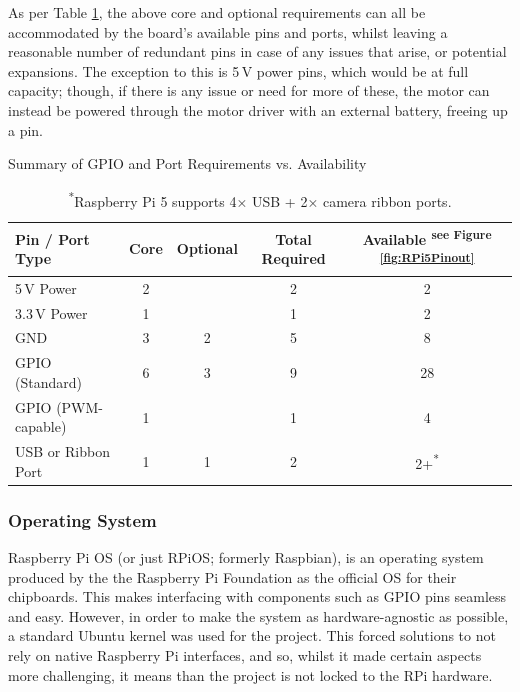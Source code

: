                 As per Table \ref{tab:pinSummary}, the above core and optional requirements can all be accommodated by the board's available pins and ports, whilst leaving a reasonable number of redundant pins in case of any issues that arise, or potential expansions. The exception to this is 5\,V power pins, which would be at full capacity; though, if there is any issue or need for more of these, the motor can instead be powered through the motor driver with an external battery, freeing up a pin. 
    
                \begin{table}[htbp]
                    \centering
                    \caption{Summary of GPIO and Port Requirements vs. Availability}
                    \label{tab:pinSummary}
                    \begin{tabular}{|l|c|c|c|c|}
                        \hline
                        \textbf{Pin / Port Type} & \textbf{Core}& \textbf{Optional}& \textbf{Total Required} & \textbf{Available} \textsuperscript{see Figure \ref{fig:RPi5Pinout}
    }}\\ \hline
                        5\,V Power & 2 & & 2 & 2 \\ \hline
                        3.3\,V Power & 1 & & 1& 2 \\ \hline
                        GND & 3 & 2 & 5 & 8 \\ \hline
                        GPIO (Standard) & 6 & 3 & 9 & 28 \\ \hline
                        GPIO (PWM-capable) & 1 & & 1 & 4 \\ \hline
                        USB or Ribbon Port & 1 & 1 & 2 & 2+\textsuperscript{*}\\ \hline
                    \end{tabular}
                    \caption*{\textsuperscript{*}Raspberry Pi 5 supports 4× USB + 2× camera ribbon ports.}
                \end{table}
    
            \subsubsection{Operating System}
    
                Raspberry Pi OS (or just RPiOS; formerly Raspbian), is an operating system produced by the the Raspberry Pi Foundation as the official OS for their chipboards. This makes interfacing with components such as GPIO pins seamless and easy. However, in order to make the system as hardware-agnostic as possible, a standard Ubuntu kernel was used for the project. This forced solutions to not rely on native Raspberry Pi interfaces, and so, whilst it made certain aspects more challenging, it means than the project is not locked to the RPi hardware.
    
